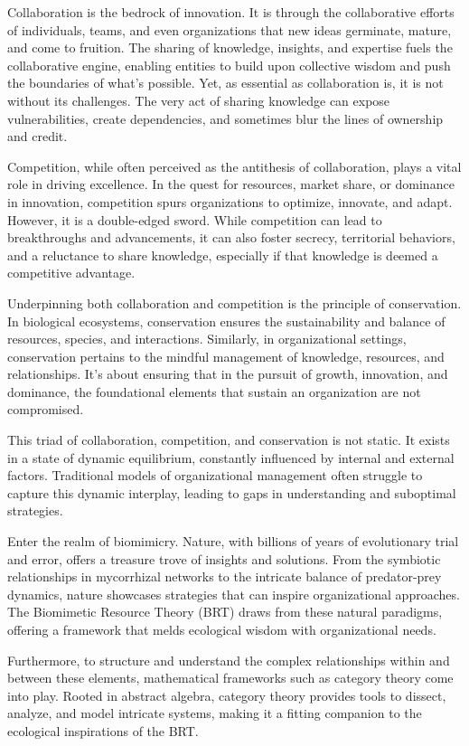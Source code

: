 \documentclass[sn-nature]{sn-jnl}%
\theoremstyle{thmstyleone}%
\theoremstyle{thmstyletwo}%
\theoremstyle{thmstylethree}%
\begin{document}
Collaboration is the bedrock of innovation. It is through the collaborative efforts of individuals, teams, and even organizations that new ideas germinate, mature, and come to fruition. The sharing of knowledge, insights, and expertise fuels the collaborative engine, enabling entities to build upon collective wisdom and push the boundaries of what's possible. Yet, as essential as collaboration is, it is not without its challenges. The very act of sharing knowledge can expose vulnerabilities, create dependencies, and sometimes blur the lines of ownership and credit.

Competition, while often perceived as the antithesis of collaboration, plays a vital role in driving excellence. In the quest for resources, market share, or dominance in innovation, competition spurs organizations to optimize, innovate, and adapt. However, it is a double-edged sword. While competition can lead to breakthroughs and advancements, it can also foster secrecy, territorial behaviors, and a reluctance to share knowledge, especially if that knowledge is deemed a competitive advantage.

Underpinning both collaboration and competition is the principle of conservation. In biological ecosystems, conservation ensures the sustainability and balance of resources, species, and interactions. Similarly, in organizational settings, conservation pertains to the mindful management of knowledge, resources, and relationships. It's about ensuring that in the pursuit of growth, innovation, and dominance, the foundational elements that sustain an organization are not compromised.

This triad of collaboration, competition, and conservation is not static. It exists in a state of dynamic equilibrium, constantly influenced by internal and external factors. Traditional models of organizational management often struggle to capture this dynamic interplay, leading to gaps in understanding and suboptimal strategies.

Enter the realm of biomimicry. Nature, with billions of years of evolutionary trial and error, offers a treasure trove of insights and solutions. From the symbiotic relationships in mycorrhizal networks to the intricate balance of predator-prey dynamics, nature showcases strategies that can inspire organizational approaches. The Biomimetic Resource Theory (BRT) draws from these natural paradigms, offering a framework that melds ecological wisdom with organizational needs.

Furthermore, to structure and understand the complex relationships within and between these elements, mathematical frameworks such as category theory come into play. Rooted in abstract algebra, category theory provides tools to dissect, analyze, and model intricate systems, making it a fitting companion to the ecological inspirations of the BRT.
\end{document}
